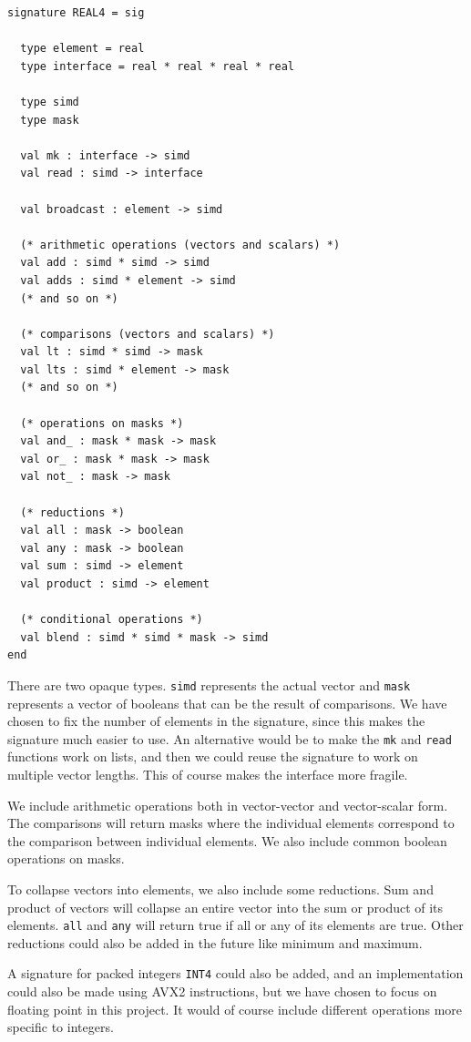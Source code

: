 \documentclass{article}
\begin{document}
\begin{lstlisting}[frame=single, caption=\texttt{REAL4} vector signature, label={lst:real4}]
signature REAL4 = sig

  type element = real
  type interface = real * real * real * real

  type simd
  type mask

  val mk : interface -> simd
  val read : simd -> interface

  val broadcast : element -> simd

  (* arithmetic operations (vectors and scalars) *)
  val add : simd * simd -> simd
  val adds : simd * element -> simd
  (* and so on *)

  (* comparisons (vectors and scalars) *)
  val lt : simd * simd -> mask
  val lts : simd * element -> mask
  (* and so on *)

  (* operations on masks *)
  val and_ : mask * mask -> mask
  val or_ : mask * mask -> mask
  val not_ : mask -> mask

  (* reductions *)
  val all : mask -> boolean
  val any : mask -> boolean
  val sum : simd -> element
  val product : simd -> element

  (* conditional operations *)
  val blend : simd * simd * mask -> simd
end
\end{lstlisting}

There are two opaque types. \verb!simd! represents the actual vector and \verb!mask! represents a vector of booleans that can be the result of comparisons. We have chosen to fix the number of elements in the signature, since this makes the signature much easier to use. An alternative would be to make the \verb!mk! and \verb!read! functions work on lists, and then we could reuse the signature to work on multiple vector lengths. This of course makes the interface more fragile.

We include arithmetic operations both in vector-vector and vector-scalar form. The comparisons will return masks where the individual elements correspond to the comparison between individual elements. We also include common boolean operations on masks.

To collapse vectors into elements, we also include some reductions. Sum and product of vectors will collapse an entire vector into the sum or product of its elements. \verb!all! and \verb!any! will return true if all or any of its elements are true. Other reductions could also be added in the future like minimum and maximum.


A signature for packed integers \texttt{INT4} could also be added, and an implementation could also be made using AVX2 instructions, but we have chosen to focus on floating point in this project. It would of course include different operations more specific to integers.
\end{document}
